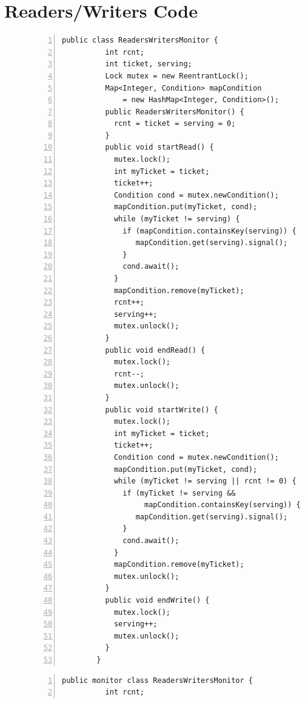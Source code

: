 \documentclass[preprint]{sigplanconf}
\begin{document}
\section{Readers/Writers Code}
\begin{figure}[ht!]
\begin{multicols}{2}
    \begin{Verbatim}[fontsize=\footnotesize,gobble=8,frame=topline,
            framesep=5mm,numbers=left,numbersep=2pt,
            label=\fbox{\small\emph{Explicit-Signal Readers/Writers}}]
        public class ReadersWritersMonitor {
          int rcnt;
          int ticket, serving;
          Lock mutex = new ReentrantLock();
          Map<Integer, Condition> mapCondition 
              = new HashMap<Integer, Condition>();
          public ReadersWritersMonitor() {
            rcnt = ticket = serving = 0;
          }
          public void startRead() {
            mutex.lock();
            int myTicket = ticket;
            ticket++;
            Condition cond = mutex.newCondition();
            mapCondition.put(myTicket, cond);
            while (myTicket != serving) {
              if (mapCondition.containsKey(serving)) {
                 mapCondition.get(serving).signal();
              }
              cond.await();
            }
            mapCondition.remove(myTicket);
            rcnt++;
            serving++;
            mutex.unlock();
          }
          public void endRead() {
            mutex.lock();
            rcnt--;
            mutex.unlock();
          }
          public void startWrite() {
            mutex.lock();
            int myTicket = ticket;
            ticket++;
            Condition cond = mutex.newCondition();
            mapCondition.put(myTicket, cond);
            while (myTicket != serving || rcnt != 0) {
              if (myTicket != serving &&
                   mapCondition.containsKey(serving)) {
                 mapCondition.get(serving).signal();
              }
              cond.await();
            }
            mapCondition.remove(myTicket);
            mutex.unlock();
          }
          public void endWrite() {
            mutex.lock();
            serving++;
            mutex.unlock();
          }
        }
    \end{Verbatim}
    \begin{Verbatim}[fontsize=\footnotesize,gobble=8,frame=lines,framesep=5mm,
            numbers=left,numbersep=2pt,
            label=\fbox{\small\emph{Implicit-Signal Readers/Writers}}]
        public monitor class ReadersWritersMonitor {
          int rcnt;

\end{Verbatim}
\end{multicols}
\end{figure}
\end{document}
